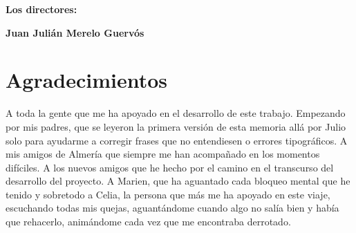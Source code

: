 \vspace{1cm}

\textbf{Los directores:}

\vspace{5cm}

\noindent \textbf{Juan Julián Merelo Guervós}

\chapter*{Agradecimientos}
\thispagestyle{empty}

       \vspace{1cm}


A toda la gente que me ha apoyado en el desarrollo de este trabajo. Empezando por mis padres, que se leyeron la primera versión de esta memoria allá por Julio solo para ayudarme a corregir frases que no entendiesen o errores tipográficos. A mis amigos de Almería que siempre me han acompañado en los momentos difíciles. A los nuevos amigos que he hecho por el camino en el transcurso del desarrollo del proyecto. A Marien, que ha aguantado cada bloqueo mental que he tenido y sobretodo a Celia, la persona que más me ha apoyado en este viaje, escuchando todas mis quejas, aguantándome cuando algo no salía bien y había que rehacerlo, animándome cada vez que me encontraba derrotado.

